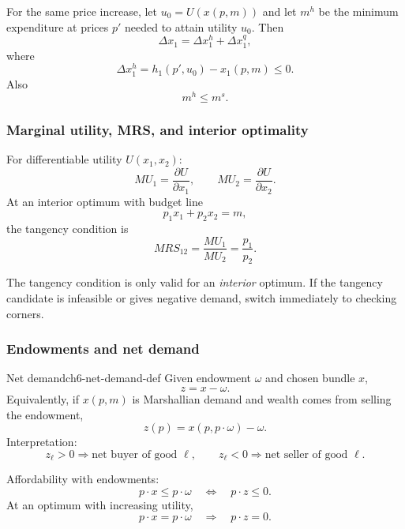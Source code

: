 \begin{keyformula}[title={Key Formula: Hicksian substitution}]
For the same price increase, let $u_0=U(x(p,m))$ and let $m^h$ be the minimum expenditure at prices $p'$ needed to attain utility $u_0$. Then
\[
\Delta x_1 = \Delta x_1^h + \Delta x_1^q,
\]
where
\[
\Delta x_1^h = h_1(p',u_0)-x_1(p,m) \le 0.
\]
Also
\[
m^h \le m^s.
\]
\end{keyformula}

\subsubsection{Marginal utility, MRS, and interior optimality}

\begin{keyformula}[title={Key Formula: MRS toolkit}]
For differentiable utility $U(x_1,x_2)$:
\[
MU_1=\frac{\partial U}{\partial x_1},
\qquad
MU_2=\frac{\partial U}{\partial x_2}.
\]
At an interior optimum with budget line
\[
p_1x_1+p_2x_2=m,
\]
the tangency condition is
\[
MRS_{12}=\frac{MU_1}{MU_2}=\frac{p_1}{p_2}.
\]
\end{keyformula}

\begin{examtip}
The tangency condition is only valid for an \emph{interior} optimum. If the tangency candidate is infeasible or gives negative demand, switch immediately to checking corners.
\end{examtip}

\subsubsection{Endowments and net demand}

\begin{definition}{Net demand}{ch6-net-demand-def}
Given endowment $\omega$ and chosen bundle $x$,
\[
z=x-\omega.
\]
Equivalently, if $x(p,m)$ is Marshallian demand and wealth comes from selling the endowment,
\[
z(p)=x(p,p\cdot \omega)-\omega.
\]
Interpretation:
\[
z_\ell>0 \Rightarrow \text{net buyer of good }\ell,
\qquad
z_\ell<0 \Rightarrow \text{net seller of good }\ell.
\]
\end{definition}

\begin{keyformula}[title={Key Formula: endowment budget and Walras' law}]
Affordability with endowments:
\[
p\cdot x \le p\cdot \omega
\quad \Longleftrightarrow \quad
p\cdot z \le 0.
\]
At an optimum with increasing utility,
\[
p\cdot x = p\cdot \omega
\quad \Longrightarrow \quad
p\cdot z = 0.
\]
\end{keyformula}

